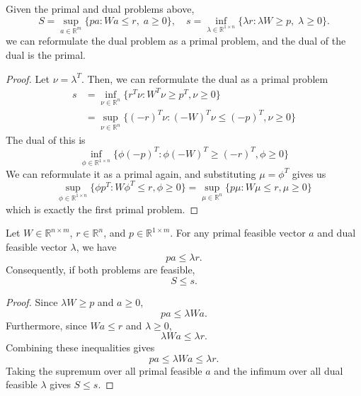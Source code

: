 	\begin{lemma}
	  \label{thm:dual-of-dual-is-primal}
	  Given the primal and dual problems above, 
		\begin{equation}
			S = \sup_{a \in \mathbb{R}^m} \{pa \colon Wa \leq r,\; a \geq 0\}, \quad s = \inf_{\lambda \in \mathbb{R}^{1 \times n}} \{\lambda r \colon \lambda W \geq p,\; \lambda \geq 0\}.
		\end{equation}
		we can reformulate the dual problem as a primal problem, and the dual of the dual is the primal. 
	\end{lemma}
	\begin{proof}
	  Let $\nu = \lambda^T$. Then, we can reformulate the dual as a primal problem
		\begin{align}
			s & = \inf_{\nu \in \mathbb{R}^n} \{r^T \nu \colon W^T \nu \geq p^T, \nu \geq 0 \} \\ 
				& = \sup_{\nu \in \mathbb{R}^n} \{ (-r)^T \nu : (-W)^T \nu \leq (-p)^T, \nu \geq 0 \}
		\end{align}
		The dual of this is 
		\begin{equation}
			\inf_{\phi \in \mathbb{R}^{1 \times n}} \{\phi (-p)^T \colon \phi (-W)^T \geq (-r)^T , \phi \geq 0 \}
		\end{equation}
		We can reformulate it as a primal again, and substituting $\mu = \phi^T$ gives us 
		\begin{equation}
			\sup_{\phi \in \mathbb{R}^{1 \times n}} \{\phi p^T \colon W \phi^T \leq r, \phi \geq 0 \} = \sup_{\mu \in \mathbb{R}^n} \{p \mu \colon W \mu \leq r, \mu \geq 0 \}
		\end{equation}
		which is exactly the first primal problem. 
	\end{proof}

	\begin{lemma}
	  \label{thm:weak-duality}
		Let $W \in \mathbb{R}^{n \times m}$, $r \in \mathbb{R}^n$, and $p \in \mathbb{R}^{1 \times m}$. For any primal feasible vector $a$ and dual feasible vector $\lambda$, we have
		\begin{equation}
			pa \leq \lambda r.
		\end{equation}
		Consequently, if both problems are feasible,
		\begin{equation}
			S \leq s.
		\end{equation}
	\end{lemma}
	\begin{proof}
		Since $\lambda W \geq p$ and $a \geq 0$,
		\begin{equation}
			pa \leq \lambda Wa.
		\end{equation}
		Furthermore, since $Wa \leq r$ and $\lambda \geq 0$,
		\begin{equation}
			\lambda Wa \leq \lambda r.
		\end{equation}
		Combining these inequalities gives
		\begin{equation}
			pa \leq \lambda Wa \leq \lambda r.
		\end{equation}
		Taking the supremum over all primal feasible $a$ and the infimum over all dual feasible $\lambda$ gives $S \leq s$.
	\end{proof}

